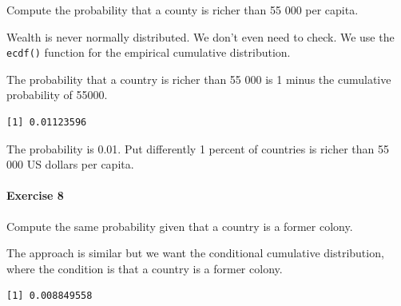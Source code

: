 \documentclass[]{article}
\newenvironment{Shaded}{\begin{snugshade}}{\end{snugshade}}
\newcommand{\KeywordTok}[1]{\textcolor[rgb]{0.13,0.29,0.53}{\textbf{#1}}}
\newcommand{\DecValTok}[1]{\textcolor[rgb]{0.00,0.00,0.81}{#1}}
\newcommand{\StringTok}[1]{\textcolor[rgb]{0.31,0.60,0.02}{#1}}
\newcommand{\CommentTok}[1]{\textcolor[rgb]{0.56,0.35,0.01}{\textit{#1}}}
\newcommand{\OperatorTok}[1]{\textcolor[rgb]{0.81,0.36,0.00}{\textbf{#1}}}
\newcommand{\NormalTok}[1]{#1}
\let\oldparagraph\paragraph
\renewcommand{\paragraph}[1]{\oldparagraph{#1}\mbox{}}
\theoremstyle{definition}
\theoremstyle{definition}
\theoremstyle{definition}
\theoremstyle{remark}
\begin{document}
Compute the probability that a county is richer than 55 000 per capita.

Wealth is never normally distributed. We don't even need to check. We
use the \texttt{ecdf()} function for the empirical cumulative
distribution.

The probability that a country is richer than 55 000 is 1 minus the
cumulative probability of 55000.

\begin{Shaded}
\end{Shaded}

\begin{verbatim}
[1] 0.01123596
\end{verbatim}

The probability is 0.01. Put differently 1 percent of countries is
richer than 55 000 US dollars per capita.

\paragraph{Exercise 8}\label{exercise-8-2}

Compute the same probability given that a country is a former colony.

The approach is similar but we want the conditional cumulative
distribution, where the condition is that a country is a former colony.

\begin{Shaded}
\end{Shaded}

\begin{verbatim}
[1] 0.008849558
\end{verbatim}
\end{document}

